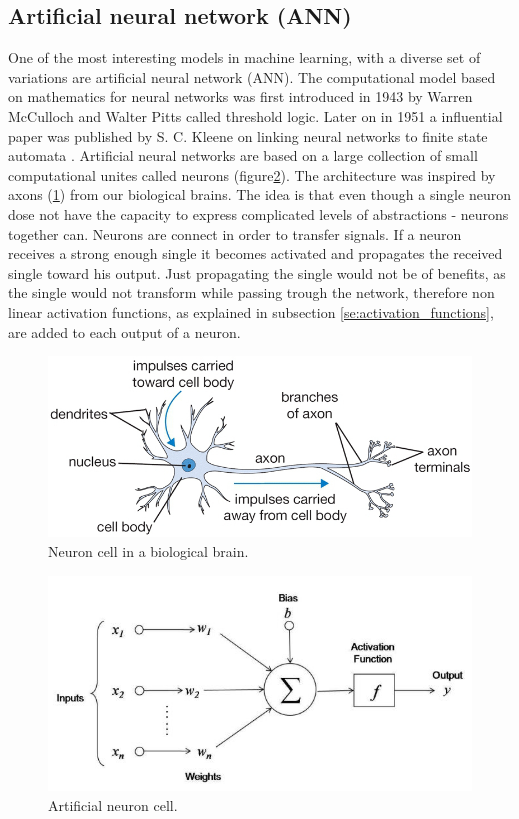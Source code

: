 \documentclass[times, utf8, diplomski]{fer}
\begin{document}
\subsection{Artificial neural network (ANN)}
One of the most interesting models in machine learning, with a diverse set of variations are artificial neural network (ANN). The computational model based on mathematics for neural networks was first introduced in 1943 by Warren McCulloch and Walter Pitts \citep{mcculloch_logical_1943}  called threshold logic. Later on in 1951 a influential paper was published by S. C. Kleene on linking neural networks to finite state automata \citep{kleene_representation_1951}. Artificial neural networks are based on a large collection of small computational unites called neurons (figure\ref{fig:ann_neuron}). The architecture was inspired by axons (\ref{fig:neuron}) from our biological brains. The idea is that even though a single neuron dose not have the capacity to express complicated levels of abstractions - neurons together can. Neurons are connect in order to transfer signals. If a neuron receives a strong enough single it becomes activated and propagates the received single toward his output. Just propagating the single would not be of benefits, as the single would not transform while passing trough the network, therefore non linear activation functions, as explained in subsection \ref{se:activation_functions}, are added to each output of a neuron.

\begin{figure}
  \includegraphics[width=\linewidth]{figures/axon.png}
  \caption{Neuron cell in a biological brain.}
  \label{fig:neuron}
\end{figure}

\begin{figure}
  \includegraphics[width=\linewidth]{figures/neuron.jpg}
  \caption{Artificial neuron cell.}
  \label{fig:ann_neuron}
\end{figure}
\end{document}
